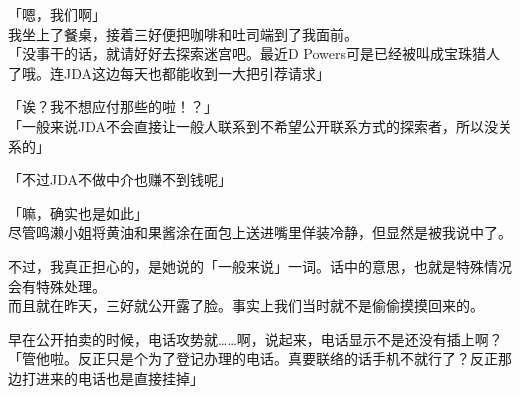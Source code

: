 「嗯，我们啊」\\

我坐上了餐桌，接着三好便把咖啡和吐司端到了我面前。\\

「没事干的话，就请好好去探索迷宫吧。最近D Powers可是已经被叫成宝珠猎人了哦。连JDA这边每天也都能收到一大把引荐请求」

「诶？我不想应付那些的啦！？」\\

「一般来说JDA不会直接让一般人联系到不希望公开联系方式的探索者，所以没关系的」

「不过JDA不做中介也赚不到钱呢」

「嘛，确实也是如此」\\

尽管鸣濑小姐将黄油和果酱涂在面包上送进嘴里佯装冷静，但显然是被我说中了。

不过，我真正担心的，是她说的「一般来说」一词。话中的意思，也就是特殊情况会有特殊处理。\\

而且就在昨天，三好就公开露了脸。事实上我们当时就不是偷偷摸摸回来的。

早在公开拍卖的时候，电话攻势就……啊，说起来，电话显示不是还没有插上啊？\\

「管他啦。反正只是个为了登记办理的电话。真要联络的话手机不就行了？反正那边打进来的电话也是直接挂掉」


